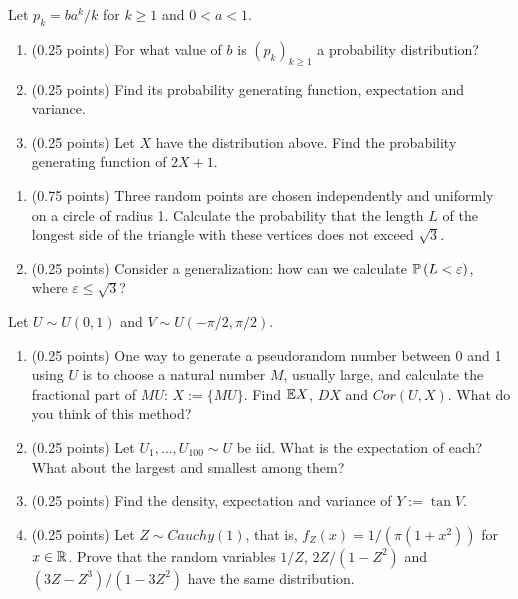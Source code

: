 \documentclass[a4paper]{report}
\begin{document}
\begin{problem}
Let $p_k=ba^k/k$ for $k\geq1$ and $0<a<1$.
\begin{enumerate}
\item (0.25 points) For what value of $b$ is $(p_k)_{k\geq1}$ a probability distribution?
\item (0.25 points) Find its probability generating function, expectation and variance.
\item (0.25 points) Let $X$ have the distribution above. Find the probability generating function of $2X+1$.
\end{enumerate}
\end{problem}
\begin{problem}
\begin{enumerate}
\item (0.75 points) Three random points are chosen independently and uniformly on a circle of radius 1. Calculate the probability that the length $L$ of the longest side of the triangle with these vertices does not exceed $\sqrt3$.
\item (0.25 points) Consider a generalization: how can we calculate $\mathbb P\left( L<\varepsilon\right)$, where $\varepsilon\leq\sqrt3$?
\end{enumerate}
\end{problem}
\begin{problem}
Let $U\sim U(0,1)$ and $V\sim U(-\pi/2,\pi/2)$.
\begin{enumerate}
\item (0.25 points) One way to generate a pseudorandom number between 0 and 1 using $U$ is to choose a natural number $M$, usually large, and calculate the fractional part of $MU$: $X:=\{MU\}$. Find $\mathbb {E} X$, $DX$ and $Cor(U,X)$. What do you think of this method?
\item (0.25 points) Let $U_1,\dots,U_{100}\sim U$ be iid. What is the expectation of each? What about the largest and smallest among them?
\item (0.25 points) Find the density, expectation and variance of $Y:=\tan V$.
\item (0.25 points) Let $Z\sim Cauchy(1)$, that is, $f_Z(x)=1/(\pi(1+x^2))$ for $x\in\mathbb R$. Prove that the random variables $1/Z$, $2Z/(1-Z^2)$ and $(3Z-Z^3)/(1-3Z^2)$ have the same distribution.
\end{enumerate}
\end{problem}
\end{document}
